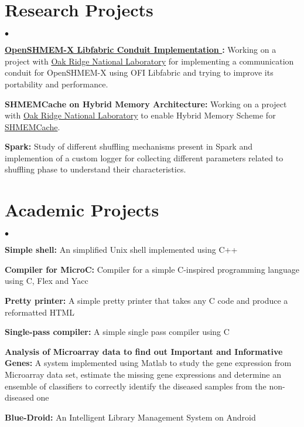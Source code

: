 \documentclass[margin,line]{res}
\newenvironment{list2}{
  \begin{list}{$\bullet$}{%
      \setlength{\itemsep}{0in}
      \setlength{\parsep}{0in} \setlength{\parskip}{0in}
      \setlength{\topsep}{0in} \setlength{\partopsep}{0in} 
      \setlength{\leftmargin}{0.2in}}}{\end{list}}
\begin{document}
\begin{resume}
\vspace*{-.15in}

\section{\sc Research Projects}
\begin{list2}
\item {\bf \href{https://github.com/ornl-languages/ornl-openshmem/}{OpenSHMEM-X 
Libfabric 
Conduit Implementation }:} Working on a project with 
\href{https://www.ornl.gov/}{Oak Ridge National Laboratory} for implementing a 
communication conduit for OpenSHMEM-X using OFI Libfabric and trying to improve 
its portability and performance.
\item {\bf SHMEMCache on Hybrid Memory Architecture:} Working on a project with 
\href{https://www.ornl.gov/}{Oak Ridge National Laboratory} to enable Hybrid 
Memory Scheme for 
\href{http://ww2.cs.fsu.edu/~fu/files/shmemcache-ccgrid17-paper.pdf}{SHMEMCache}.
\item {\bf Spark:} Study of different shuffling mechanisms present in Spark and 
implemention of a custom logger for collecting different parameters related to 
shuffling phase to understand their characteristics.
\end{list2}

\vspace*{-.15in}

\section{\sc Academic Projects}
\begin{list2}
\item {\bf Simple shell:} An simplified Unix shell implemented using C++
\item {\bf Compiler for MicroC:} Compiler for a simple C-inspired programming 
language using C, Flex and Yacc
\item {\bf Pretty printer:} A simple pretty printer that takes any C code and 
produce a reformatted HTML
\item {\bf Single-pass compiler:} A simple single pass compiler using C
\item {\bf Analysis of Microarray data to find out Important and Informative 
Genes:} A system implemented using Matlab to study the gene expression from
Microarray data set, estimate the missing gene expressions and determine an 
ensemble of classifiers to correctly identify the diseased samples
from the non-diseased one
\item {\bf Blue-Droid:} An Intelligent Library Management System on Android
\end{list2}


\end{resume}
\end{document}
